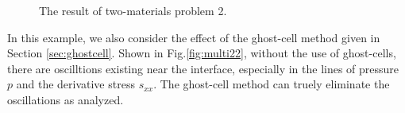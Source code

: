 \documentclass[review]{elsarticle}
\begin{document}
\begin{figure}

	  \caption{The result of two-materials  problem 2.}
      \label{fig:multi2}
    \end{figure}

	In this example, we also consider the effect of the ghost-cell method given in Section \ref{sec:ghostcell}. Shown in Fig.\ref{fig:multi22}, without the use of  ghost-cells, there are  oscilltions existing near the interface, especially in  the lines of pressure $p$ and the derivative stress $s_{xx}$.  The ghost-cell method can truely eliminate the oscillations as analyzed.
\end{document}
